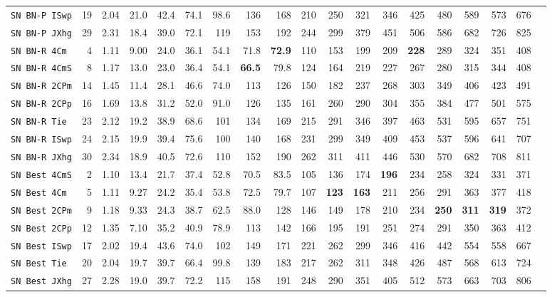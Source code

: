 \begin{tabular}{l | r @{~~} r | r@{~~}r@{~~}r@{~~}r@{~~}r@{~~}r@{~~}r@{~~}r@{~~}r@{~~}r@{~~}r@{~~}r@{~~}r@{~~}r@{~~}r@{~~}r|}
\verb+SN BN-P ISwp+ & 19 & 2.04 & 21.0&42.4&74.1&98.6&136&168&210&250&321&346&425&480&589&573&676\\
\verb+SN BN-P JXhg+ & 29 & 2.31 & 18.4&39.0&72.1&119&153&192&244&299&379&451&506&586&682&726&825\smallskip \\
\verb+SN BN-R 4Cm + & 4 & 1.11 & 9.00&24.0&36.1&54.1&71.8&\textbf{72.9}&110&153&199&209&\textbf{228}&289&324&351&408\\
\verb+SN BN-R 4CmS+ & 8 & 1.17 & 13.0&23.0&36.4&54.1&\textbf{66.5}&79.8&124&164&219&227&267&280&315&344&408\\
\verb+SN BN-R 2CPm+ & 14 & 1.45 & 11.4&28.1&46.6&74.0&113&126&150&182&237&268&303&349&406&423&491\\
\verb+SN BN-R 2CPp+ & 16 & 1.69 & 13.8&31.2&52.0&91.0&126&135&161&260&290&304&355&384&477&501&575\\
\verb+SN BN-R Tie + & 23 & 2.12 & 19.2&38.9&68.6&101&134&169&215&291&346&397&463&531&595&657&751\\
\verb+SN BN-R ISwp+ & 24 & 2.15 & 19.9&39.4&75.6&100&140&168&231&299&349&409&453&537&596&641&707\\
\verb+SN BN-R JXhg+ & 30 & 2.34 & 18.9&40.5&72.6&110&152&190&262&311&411&446&530&570&682&708&811\smallskip \\
\verb+SN Best 4CmS+ & 2 & 1.10 & 13.4&21.7&37.4&52.8&70.5&83.5&105&136&174&\textbf{196}&234&258&324&331&371\\
\verb+SN Best 4Cm + & 5 & 1.11 & 9.27&24.2&35.4&53.8&72.5&79.7&107&\textbf{123}&\textbf{163}&211&256&291&363&377&418\\
\verb+SN Best 2CPm+ & 9 & 1.18 & 9.33&24.3&38.7&62.5&88.0&128&146&149&178&210&234&\textbf{250}&\textbf{311}&\textbf{319}&372\\
\verb+SN Best 2CPp+ & 12 & 1.35 & 7.10&35.2&40.9&78.9&113&142&166&195&191&251&274&291&350&363&412\\
\verb+SN Best ISwp+ & 17 & 2.02 & 19.4&43.6&74.0&102&149&171&221&262&299&346&416&442&554&558&667\\
\verb+SN Best Tie + & 20 & 2.04 & 19.7&39.7&66.4&99.8&139&183&217&262&311&348&426&487&568&613&724\\
\verb+SN Best JXhg+ & 27 & 2.28 & 19.0&39.7&72.2&115&158&191&248&290&351&405&512&573&663&703&806\\
\end{tabular}

